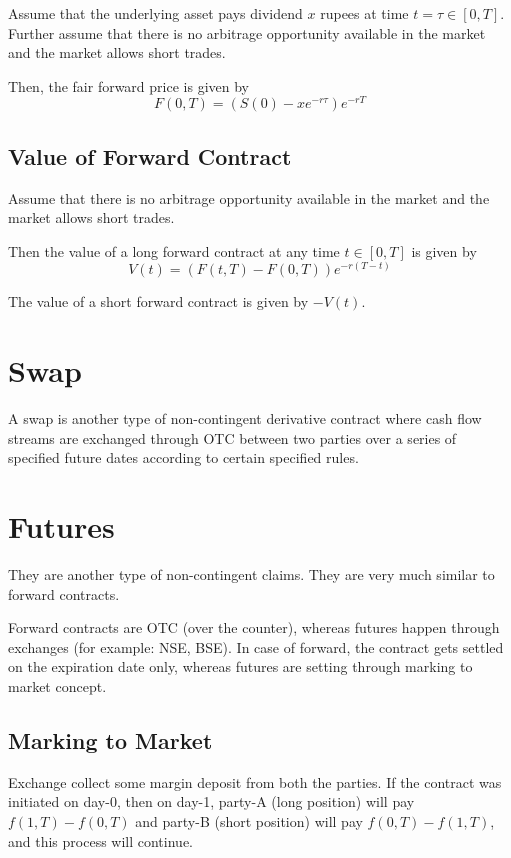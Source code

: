 \documentclass{report}
\begin{document}
Assume that the underlying asset pays dividend $x$ rupees at time $t = \tau \in [0,T]$. Further assume that there is no arbitrage opportunity available in the market and the market allows short trades.


Then, the fair forward price is given by
\begin{equation}
F(0,T) = (S(0)-xe^{-r\tau})e^{-rT}
\end{equation}


\subsection{Value of Forward Contract}
Assume that there is no arbitrage opportunity available in the market and the market allows short trades.


Then the value of a long forward contract at any time $t \in [0,T]$ is given by
\[
V(t) = (F(t,T)-F(0,T))e^{-r(T-t)}
\]

The value of a short forward contract is given by $-V(t)$.



\section{Swap}
A swap is another type of non-contingent derivative contract where cash flow streams are exchanged through OTC between two parties over a series of specified future dates according to certain specified rules.


\section{Futures}
They are another type of non-contingent claims. They are very much similar to forward contracts.


Forward contracts are OTC (over the counter), whereas futures happen through exchanges (for example: NSE, BSE). In case of forward, the contract gets settled on the expiration date only, whereas futures are setting through marking to market concept.

\subsection{Marking to Market}
Exchange collect some margin deposit from both the parties. If the contract was initiated on day-0, then on day-1, party-A (long position) will pay $f(1, T)- f(0, T)$ and party-B (short position) will pay $f(0, T)- f(1, T)$, and this process will continue.
\end{document}
